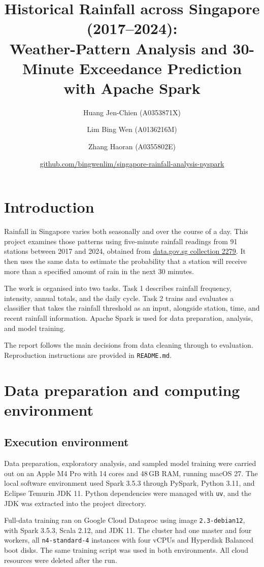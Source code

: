 \documentclass[11pt]{article}
\title{Historical Rainfall across Singapore (2017--2024):\\ Weather-Pattern Analysis and 30-Minute Exceedance Prediction with Apache Spark}
\author{Huang Jen-Chien (A0353871X) \and Lim Bing Wen (A0136216M) \and Zhang Haoran (A0355802E)}
\date{\href{https://github.com/bingwenlim/singapore-rainfall-analysis-pyspark}{github.com/bingwenlim/singapore-rainfall-analysis-pyspark}}
\begin{document}
\maketitle

\section{Introduction}

Rainfall in Singapore varies both seasonally and over the course of a day. This project examines those patterns using five-minute rainfall readings from 91 stations between 2017 and 2024, obtained from \href{https://data.gov.sg/collections/2279/view}{data.gov.sg collection 2279}. It then uses the same data to estimate the probability that a station will receive more than a specified amount of rain in the next 30 minutes.

The work is organised into two tasks. Task 1 describes rainfall frequency, intensity, annual totals, and the daily cycle. Task 2 trains and evaluates a classifier that takes the rainfall threshold as an input, alongside station, time, and recent rainfall information. Apache Spark is used for data preparation, analysis, and model training.

The report follows the main decisions from data cleaning through to evaluation. Reproduction instructions are provided in \texttt{README.md}.

\section{Data preparation and computing environment}

\subsection{Execution environment}

Data preparation, exploratory analysis, and sampled model training were carried out on an Apple M4 Pro with 14 cores and 48\,GB RAM, running macOS 27. The local software environment used Spark 3.5.3 through PySpark, Python 3.11, and Eclipse Temurin JDK 11. Python dependencies were managed with \texttt{uv}, and the JDK was extracted into the project directory.

Full-data training ran on Google Cloud Dataproc using image \texttt{2.3-debian12}, with Spark 3.5.3, Scala 2.12, and JDK 11. The cluster had one master and four workers, all \texttt{n4-standard-4} instances with four vCPUs and Hyperdisk Balanced boot disks. The same training script was used in both environments. All cloud resources were deleted after the run.
\end{document}
